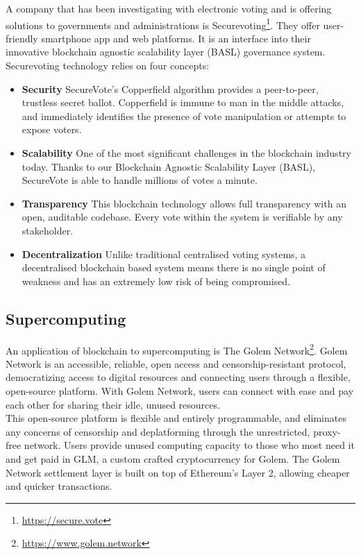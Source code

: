 \documentclass[10pt]{article}
\begin{document}
\begin{multicols}{2}
A company that has been investigating with electronic voting and is offering solutions to governments and administrations is Securevoting\footnote{\url{https://secure.vote}}. They offer user-friendly smartphone app and web platforms. It is an interface into their innovative blockchain agnostic scalability layer (BASL) governance system.\\

Securevoting technology relies on four concepts:

\begin{itemize}
	\item \textbf{Security} SecureVote’s Copperfield algorithm provides a peer-to-peer, trustless secret ballot. Copperfield is immune to man in the middle attacks, and immediately identifies the presence of vote manipulation or attempts to expose voters.
	\item \textbf{Scalability} One of the most significant challenges in the blockchain industry today. Thanks to our Blockchain Agnostic Scalability Layer (BASL), SecureVote is able to handle millions of votes a minute.
	\item \textbf{Transparency} This blockchain technology allows full transparency with an open, auditable codebase. Every vote within the system is verifiable by any stakeholder.
	\item \textbf{Decentralization} Unlike traditional centralised voting systems, a decentralised blockchain based system means there is no single point of weakness and has an extremely low risk of being compromised.
\end{itemize}

\subsection{Supercomputing}

An application of blockchain to supercomputing is The Golem Network\footnote{\url{https://www.golem.network}}. Golem Network is an accessible, reliable, open access and censorship-resistant protocol, democratizing access to digital resources and connecting users through a flexible, open-source platform. With Golem Network, users can connect with ease and pay each other for sharing their idle, unused resources.\\

This open-source platform is flexible and entirely programmable, and eliminates any concerns of censorship and deplatforming through the unrestricted, proxy-free network. Users provide unused computing capacity to those who most need it and get paid in GLM, a custom crafted cryptocurrency for Golem. The Golem Network settlement layer is built on top of Ethereum’s Layer 2, allowing cheaper and quicker transactions.\\


\end{multicols}
\end{document}
